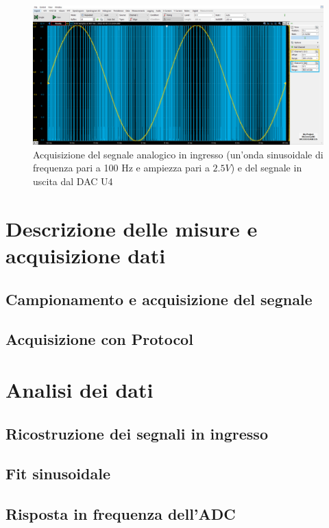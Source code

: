 \documentclass[10pt, a4paper, italian]{article}
\begin{document}
\begin{figure}[htbp]
    \centering
	\includegraphics[width=\textwidth]{Conv.Sinusoide.100Hz.2}
    \caption{Acquisizione del segnale analogico in ingresso (un'onda sinusoidale di frequenza pari a 100 Hz e ampiezza pari a $2.5 V$) e del segnale in uscita dal DAC U4}
\end{figure}
\section{Descrizione delle misure e acquisizione dati}

\subsection{Campionamento e acquisizione del segnale}

\subsection{Acquisizione con Protocol}

\section{Analisi dei dati}

\subsection{Ricostruzione dei segnali in ingresso}

\subsection{Fit sinusoidale}

\subsection{Risposta in frequenza dell'ADC}
\end{document}
